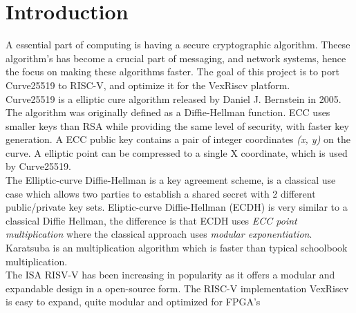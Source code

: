 \section{Introduction}
A essential part of computing is having a secure cryptographic algorithm. Theese algorithm's has become a crucial part of messaging, and network systems, hence the focus on making these algorithms faster.
The goal of this project is to port Curve25519 to RISC-V, and optimize it for the VexRiscv platform.
\\
Curve25519 is a elliptic cure algorithm released by Daniel J. Bernstein in 2005. The algorithm was originally defined as a Diffie-Hellman function.
ECC uses smaller keys than RSA while providing the same level of security, with faster key generation.
A ECC public key contains a pair of integer coordinates \textit{(x, y)} on the curve. A elliptic point can be compressed to a single X coordinate, which is used by Curve25519.
\\
The Elliptic-curve Diffie-Hellman is a key agreement scheme, is a classical use case which allows two parties to establish a shared secret with 2 different public/private key sets. 
Eliptic-curve Diffie-Hellman (ECDH) is very similar to a classical Diffie Hellman, the difference is that ECDH uses \textit{ECC point multiplication} where the classical approach uses \textit{modular exponentiation}.\\
Karatsuba is an multiplication algorithm which is faster than typical schoolbook multiplication. \\
The ISA RISV-V has been increasing in popularity as it offers a modular and expandable design in a open-source form. The RISC-V implementation VexRiscv is easy to expand, quite modular and optimized for FPGA's
\pagebreak